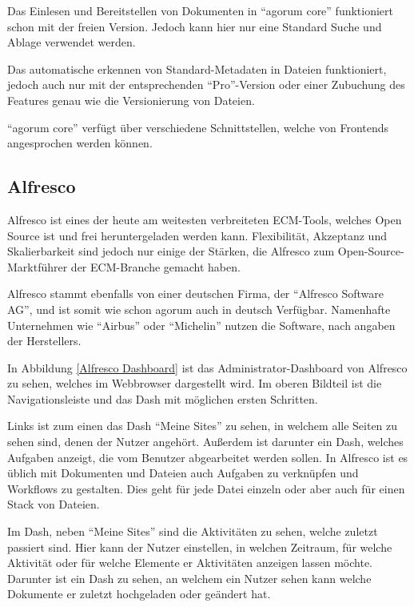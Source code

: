 Das Einlesen und Bereitstellen von Dokumenten in "`agorum core"' funktioniert schon mit der freien Version. Jedoch kann hier nur eine Standard Suche und Ablage verwendet werden. \cite{agorum_preise}

Das automatische erkennen von Standard-Metadaten in Dateien funktioniert, jedoch auch nur mit der entsprechenden "`Pro"'-Version oder einer Zubuchung des Features genau wie die Versionierung von Dateien.

"`agorum core"' verf\"ugt \"uber verschiedene Schnittstellen, welche von Frontends angesprochen werden k\"onnen. 

\subsection{Alfresco} \label{Alfresco}
Alfresco ist eines der heute am weitesten verbreiteten \ac{ECM}-Tools, welches Open Source ist und frei heruntergeladen werden kann.
Flexibilit\"at, Akzeptanz und Skalierbarkeit sind jedoch nur einige der St\"arken, die Alfresco zum Open-Source-Marktf\"uhrer der \ac{ECM}-Branche gemacht haben. \cite{Alfresco_und_Liferay} \cite{Wiki_Alfresco} \cite{Alfresco_Implementation}

Alfresco stammt ebenfalls von einer deutschen Firma, der "`Alfresco Software AG"', und ist somit wie schon agorum auch in deutsch Verf\"ugbar. Namenhafte Unternehmen wie "`Airbus"' oder "`Michelin"' nutzen die Software, nach angaben der Herstellers. \cite{Alfresco_Website}

In Abbildung \ref{Alfresco Dashboard} ist das Administrator-Dashboard von Alfresco zu sehen, welches im Webbrowser dargestellt wird.
Im oberen Bildteil ist die Navigationsleiste und das Dash mit m\"oglichen ersten Schritten.

Links ist zum einen das Dash "`Meine Sites"' zu sehen, in welchem alle Seiten zu sehen sind, denen der Nutzer angeh\"ort. Au\ss{}erdem ist darunter ein Dash, welches Aufgaben anzeigt, die vom Benutzer abgearbeitet werden sollen. In Alfresco ist es \"ublich mit Dokumenten und Dateien auch Aufgaben zu verkn\"upfen und Workflows zu gestalten. Dies geht f\"ur jede Datei einzeln oder aber auch f\"ur einen Stack von Dateien.

Im Dash, neben "`Meine Sites"' sind die Aktivit\"aten zu sehen, welche zuletzt passiert sind. Hier kann der Nutzer einstellen, in welchen Zeitraum, f\"ur welche Aktivit\"at oder f\"ur welche Elemente er Aktivit\"aten anzeigen lassen m\"ochte.
Darunter ist ein Dash zu sehen, an welchem ein Nutzer sehen kann welche Dokumente er zuletzt hochgeladen oder ge\"andert hat.

